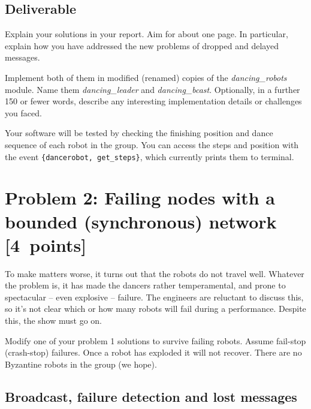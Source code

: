 \documentclass[a4paper]{article}
\begin{document}
\subsection*{Deliverable} %
\label{sub:p1_deliverable}

Explain your solutions in your report. Aim for about one page.
In particular, explain how you have addressed the new
problems of dropped and delayed messages.

Implement both of them in modified (renamed) copies of the
\emph{dancing\_robots} module. Name them \emph{dancing\_leader} and
\emph{dancing\_bcast}. Optionally, in a further 150 or fewer words, describe any
interesting implementation details or challenges you faced.

Your software will be tested by checking the finishing position and dance
sequence of each robot in the group. You can access the steps and position
with the event \verb!{dancerobot, get_steps}!, which currently prints them
to terminal.












\section*{Problem 2: Failing nodes with a bounded (synchronous) network [4~points]} %
\label{sec:problem_2_failing_nodes}

To make matters worse, it turns out that the robots do not travel well.
Whatever the problem is, it has made the dancers rather temperamental, and
prone to spectacular -- even explosive -- failure. The engineers are reluctant
to discuss this, so it's not clear which or how many robots will fail during
a performance. Despite this, the show must go on.

Modify one of your problem 1 solutions to survive failing robots. Assume
fail-stop (crash-stop) failures. Once a robot has exploded it will not
recover. There are no Byzantine robots in the group (we hope).


\subsection*{Broadcast, failure detection and lost messages} %
\label{subsec:lost_messages}
\end{document}
